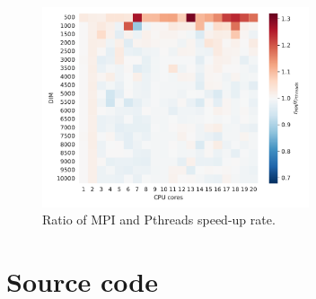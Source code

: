 \documentclass[twoside,12pt]{article}
\theoremstyle{definition}
\theoremstyle{remark}
\begin{document}
\begin{figure}[h!]
    \centering
    \includegraphics[width=0.7\textwidth]{../analysis/mpi2pth.pdf}
    \caption{Ratio of MPI and Pthreads speed-up rate.}
    \label{fig:mpi2pth}
\end{figure}

\clearpage
\newpage
\section{Source code}











\end{document}
